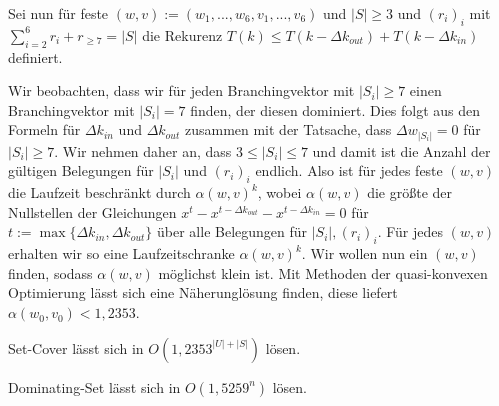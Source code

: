   Sei nun für feste \( (w,v) := (w_1,...,w_6,v_1,...,v_6)\) und \(|S| \geq 3\) und \((r_i)_i\) mit \(\sum_{i=2}^6 r_i + r_{\geq 7} = |S|\) die Rekurenz \(T(k) \leq T(k-\Delta k_{out}) + T(k - \Delta k_{in})\) definiert.

  Wir beobachten, dass wir für jeden Branchingvektor mit \(|S_i| \geq 7\) einen Branchingvektor mit \(|S_i| = 7\) finden, der diesen dominiert. Dies folgt aus den Formeln für \(\Delta k_{in}\) und \(\Delta k_{out}\) zusammen mit der Tatsache, dass \(\Delta w_{|S_i|} = 0\) für \(|S_i| \geq 7\). Wir nehmen daher an, dass \(3 \leq |S_i| \leq 7\) und damit ist die Anzahl der gültigen Belegungen für \(|S_i|\) und \((r_i)_i\) endlich. Also ist für jedes feste \((w,v)\) die Laufzeit beschränkt durch \(\alpha(w,v)^k\), wobei \(\alpha(w,v)\) die größte der Nullstellen der Gleichungen \(x^t - x^{t-\Delta k_{out}} - x^{t - \Delta k_{in}} = 0\) für \(t := \max \{ \Delta k_{in}, \Delta k_{out} \}\) über alle Belegungen für \(|S_i|,(r_i)_i\). Für jedes \((w,v)\) erhalten wir so eine Laufzeitschranke \(\alpha(w,v)^k\). Wir wollen nun ein \((w,v)\) finden, sodass \(\alpha(w,v)\) möglichst klein ist. Mit Methoden der quasi-konvexen Optimierung lässt sich eine Näherunglösung finden, diese liefert \(\alpha(w_0,v_0) < 1,2353\).

  \begin{theorem}
    Set-Cover lässt sich in \(O(1,2353^{|U|+|S|})\) lösen.
  \end{theorem}

  \begin{corollary}
    Dominating-Set lässt sich in \(O(1,5259^n)\) lösen.
  \end{corollary}




